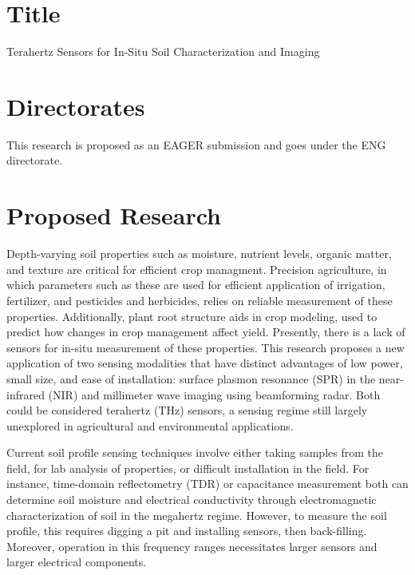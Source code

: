 \documentclass[10pt,letterpaper]{article}
\begin{document}
\section{Title}
Terahertz Sensors for In-Situ Soil Characterization and Imaging
\section{Directorates}
This research is proposed as an EAGER submission and goes under the ENG directorate.
\section{Proposed Research}

Depth-varying soil properties such as moisture, nutrient levels, organic matter, and texture are critical for efficient crop managment. Precision agriculture, in which parameters such as these are used for efficient application of irrigation, fertilizer, and pesticides and herbicides, relies on reliable measurement of these properties.  Additionally, plant root structure aids in crop modeling, used to predict how changes in crop management affect yield. Presently, there is a lack of sensors for in-situ measurement of these properties. This research proposes a new application of two sensing modalities that have distinct advantages of low power, small size, and ease of installation: surface plasmon resonance (SPR) in the near-infrared (NIR) and millimeter wave imaging using beamforming radar. Both could be considered terahertz (THz) sensors, a sensing regime still largely unexplored in agricultural and environmental applications.

Current soil profile sensing techniques involve either taking samples from the field, for lab analysis of properties, or difficult installation in the field. For instance, time-domain reflectometry (TDR) \cite{topp1980electromagnetic} or capacitance measurement \cite{birchak1974high} both can determine soil moisture and electrical conductivity through electromagnetic characterization of soil in the megahertz regime. However, to measure the soil profile, this requires digging a pit and installing sensors, then back-filling. Moreover, operation in this frequency ranges necessitates larger sensors and larger electrical components.
\end{document}
